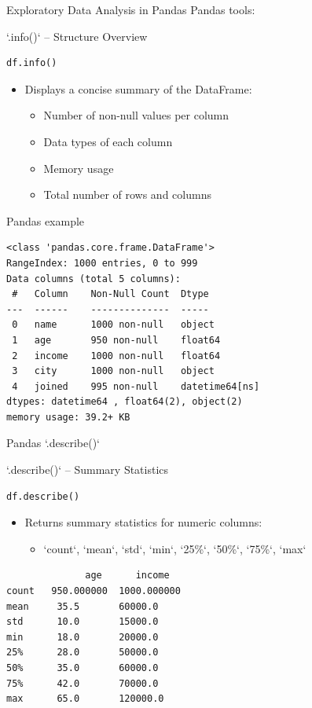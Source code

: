 \documentclass[aspectratio=169]{beamer}
\begin{document}
\begin{frame}[label={sec:orgaceb683},fragile]{Exploratory Data Analysis in Pandas}
 Pandas tools:
\begin{block}{`.info()` – Structure Overview}
\begin{verbatim}
df.info()
\end{verbatim}

\begin{itemize}
\item Displays a concise summary of the DataFrame:
\begin{itemize}
\item Number of non-null values per column
\item Data types of each column
\item Memory usage
\item Total number of rows and columns
\end{itemize}
\end{itemize}
\end{block}

\begin{block}{Pandas example}
\begin{verbatim}
<class 'pandas.core.frame.DataFrame'>
RangeIndex: 1000 entries, 0 to 999
Data columns (total 5 columns):
 #   Column    Non-Null Count  Dtype  
---  ------    --------------  -----  
 0   name      1000 non-null   object 
 1   age       950 non-null    float64
 2   income    1000 non-null   float64
 3   city      1000 non-null   object 
 4   joined    995 non-null    datetime64[ns]
dtypes: datetime64 , float64(2), object(2)
memory usage: 39.2+ KB
\end{verbatim}
\end{block}
\end{frame}
\begin{frame}[label={sec:org2aab128},fragile]{Pandas `.describe()`}
 \begin{block}{`.describe()` – Summary Statistics}
\begin{verbatim}
df.describe()
\end{verbatim}

\begin{itemize}
\item Returns summary statistics for numeric columns:
\begin{itemize}
\item `count`, `mean`, `std`, `min`, `25\%`, `50\%`, `75\%`, `max`
\end{itemize}
\end{itemize}

\begin{verbatim}
              age      income
count   950.000000  1000.000000
mean     35.5       60000.0
std      10.0       15000.0
min      18.0       20000.0
25%      28.0       50000.0
50%      35.0       60000.0
75%      42.0       70000.0
max      65.0       120000.0
\end{verbatim}
\end{block}
\end{frame}
\end{document}

